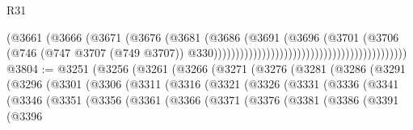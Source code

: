 \begin{lexlean}{R31}
\begin{coremodule}
                                                                      (@3661
                                                                        (@3666
                                                                          (@3671
                                                                            (@3676
                                                                              (@3681
                                                                                (@3686
                                                                                  (@3691
                                                                                    (@3696
                                                                                      (@3701
                                                                                        (@3706
                                                                                          (@746
                                                                                            (@747
                                                                                              @3707
                                                                                              (@749
                                                                                                @3707))
                                                                                            @330))))))))))))))))))))))))))))))))))))))))))))
@3804 := @3251
    (@3256
      (@3261
        (@3266
          (@3271
            (@3276
              (@3281
                (@3286
                  (@3291
                    (@3296
                      (@3301
                        (@3306
                          (@3311
                            (@3316
                              (@3321
                                (@3326
                                  (@3331
                                    (@3336
                                      (@3341
                                        (@3346
                                          (@3351
                                            (@3356
                                              (@3361
                                                (@3366
                                                  (@3371
                                                    (@3376
                                                      (@3381
                                                        (@3386
                                                          (@3391
                                                            (@3396

\end{coremodule}
\end{lexlean}
